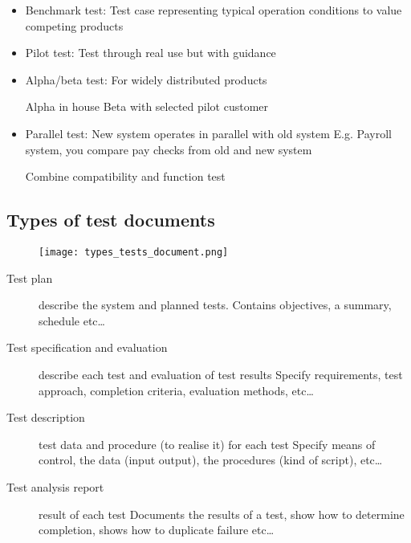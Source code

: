 \begin{itemize}
    \item Benchmark test:
        Test case representing typical operation conditions to value competing products
    \item Pilot test:
        Test through real use but with guidance
    \item Alpha/beta test: For widely distributed products

        Alpha in house\newline
        Beta with selected pilot customer
    \item Parallel test:
        New system operates in parallel with old system
        E.g. Payroll system, you compare pay checks from old and new system

        Combine compatibility and function test
\end{itemize}

\subsection{Types of test documents}

\begin{figure}[!ht]
    \centering
    \texttt{[image: types\_tests\_document.png]}
\end{figure}

\begin{description}
    \item[Test plan] describe the system and planned tests.
        \subitem{} Contains objectives, a summary, schedule etc\ldots
    \item[Test specification and evaluation] describe each test and evaluation of test results
        \subitem{} Specify requirements, test approach, completion criteria, evaluation methods, etc\ldots
    \item[Test description] test data and procedure (to realise it) for each test
        \subitem{} Specify means of control, the data (input output), the procedures (kind of script), etc\ldots
    \item[Test analysis report] result of each test
        \subitem{} Documents the results of a test, show how to determine completion, shows how to duplicate failure etc\ldots
\end{description}
